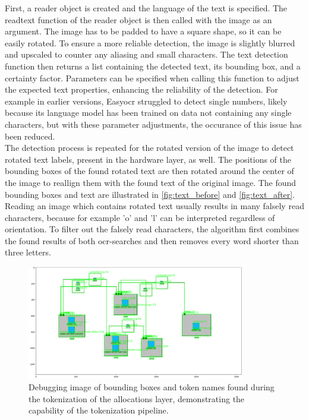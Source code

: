 First, a reader object is created and the language of the text is specified. The readtext function of the reader object is then called with the image as an argument. The image has to be padded to have a square shape, so it can be easily rotated. To ensure a more reliable detection, the image is slightly blurred and upscaled to counter any aliasing and small characters. The text detection function then returns a list containing the detected text, its bounding box, and a certainty factor. Parameters can be specified when calling this function to adjust the expected text properties, enhancing the reliability of the detection. For example in earlier versions, Easy\acrshort{ocr} struggled to detect single numbers, likely because its language model has been trained on data not containing any single characters, but with these parameter adjustments, the occurance of this issue has been reduced.\\
The detection process is repeated for the rotated version of the image to detect rotated text labels, present in the hardware layer, as well. The positions of the bounding boxes of the found rotated text are then rotated around the center of the image to reallign them with the found text of the original image. The found bounding boxes and text are illustrated in \autoref{fig:text_before} and \ref{fig:text_after}. Reading an image which contains rotated text usually results in many falsely read characters, because for example 'o' and 'l' can be interpreted regardless of orientation. To filter out the falsely read characters, the algorithm first combines the found results of both \acrshort{ocr}-searches and then removes every word shorter than three letters.\\
\begin{figure}[H]
    \centering
    \includegraphics[width=0.85\textwidth]{pictures/allocations_found_tokens.png}
    \caption[Debugging image of bounding boxes and token names]{Debugging image of bounding boxes and token names found during the tokenization of the allocations layer, demonstrating the capability of the tokenization pipeline.}
    \label{fig:allocations_found_tokens}
\end{figure}
